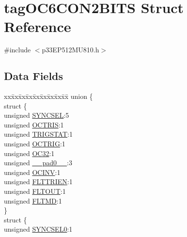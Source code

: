 \hypertarget{structtag_o_c6_c_o_n2_b_i_t_s}{}\section{tag\+O\+C6\+C\+O\+N2\+B\+I\+TS Struct Reference}
\label{structtag_o_c6_c_o_n2_b_i_t_s}


{\ttfamily \#include $<$p33\+E\+P512\+M\+U810.\+h$>$}

\subsection*{Data Fields}
\begin{DoxyCompactItemize}
\item 
\begin{tabbing}
xx\=xx\=xx\=xx\=xx\=xx\=xx\=xx\=xx\=\kill
union \{\\
\>struct \{\\
\>\>unsigned \hyperlink{structtag_o_c6_c_o_n2_b_i_t_s_a35fbbe11485c2615ed27535b62c3fa35}{SYNCSEL}:5\\
\>\>unsigned \hyperlink{structtag_o_c6_c_o_n2_b_i_t_s_ab849a74c6179282ed6b06cc047c80544}{OCTRIS}:1\\
\>\>unsigned \hyperlink{structtag_o_c6_c_o_n2_b_i_t_s_ab379549de54ac93ad4aa73686c34cb7c}{TRIGSTAT}:1\\
\>\>unsigned \hyperlink{structtag_o_c6_c_o_n2_b_i_t_s_a8d2cf9b996ef2b9079defa8950de798c}{OCTRIG}:1\\
\>\>unsigned \hyperlink{structtag_o_c6_c_o_n2_b_i_t_s_af52e127483a703e0fa84c7d4f1de0df4}{OC32}:1\\
\>\>unsigned \hyperlink{structtag_o_c6_c_o_n2_b_i_t_s_adf71f3d8410c1f1dbbc96680a92c49af}{\_\_pad0\_\_}:3\\
\>\>unsigned \hyperlink{structtag_o_c6_c_o_n2_b_i_t_s_a301004fca40c8d19d418866c92c19a06}{OCINV}:1\\
\>\>unsigned \hyperlink{structtag_o_c6_c_o_n2_b_i_t_s_ab979b75e02643aa840fb6ee50e0c30fa}{FLTTRIEN}:1\\
\>\>unsigned \hyperlink{structtag_o_c6_c_o_n2_b_i_t_s_ae466664b094d9c830e9ce20b86d7907f}{FLTOUT}:1\\
\>\>unsigned \hyperlink{structtag_o_c6_c_o_n2_b_i_t_s_a245ca3019d6c6ccbfb09f1c821146bb5}{FLTMD}:1\\
\>\} \\
\>struct \{\\
\>\>unsigned \hyperlink{structtag_o_c6_c_o_n2_b_i_t_s_a3b5df3154fde5141e6ac0156425ff8b4}{SYNCSEL0}:1\\

\end{tabbing}
\end{DoxyCompactItemize}
